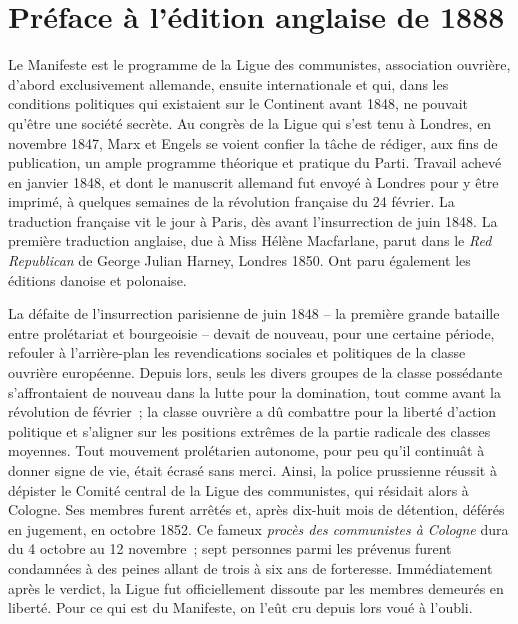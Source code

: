 \documentclass[french,twoside]{book} %
\begin{document}
\section[{Préface à l’édition anglaise de 1888}]{Préface à l’édition anglaise de 1888}
\noindent Le Manifeste est le programme de la Ligue des communistes, association ouvrière, d’abord exclusivement allemande, ensuite internationale et qui, dans les conditions politiques qui existaient sur le Continent avant 1848, ne pouvait qu’être une société secrète. Au congrès de la Ligue qui s’est tenu à Londres, en novembre 1847, Marx et Engels se voient confier la tâche de rédiger, aux fins de publication, un ample programme théorique et pratique du Parti. Travail achevé en janvier 1848, et dont le manuscrit allemand fut envoyé à Londres pour y être imprimé, à quelques semaines de la révolution française du 24 février. La traduction française vit le jour à Paris, dès avant l’insurrection de juin 1848. La première traduction anglaise, due à Miss Hélène Macfarlane, parut dans le \emph{Red Republican} de George Julian Harney, Londres 1850. Ont paru également les éditions danoise et polonaise.\par
La défaite de l’insurrection parisienne de juin 1848 – la première grande bataille entre prolétariat et bourgeoisie – devait de nouveau, pour une certaine période, refouler à l’arrière-plan les revendications sociales et politiques de la classe ouvrière européenne. Depuis lors, seuls les divers groupes de la classe possédante s’affrontaient de nouveau dans la lutte pour la domination, tout comme avant la révolution de février ; la classe ouvrière a dû combattre pour la liberté d’action politique et s’aligner sur les positions extrêmes de la partie radicale des classes moyennes. Tout mouvement prolétarien autonome, pour peu qu’il continuât à donner signe de vie, était écrasé sans merci. Ainsi, la police prussienne réussit à dépister le Comité central de la Ligue des communistes, qui résidait alors à Cologne. Ses membres furent arrêtés et, après dix-huit mois de détention, déférés en jugement, en octobre 1852. Ce fameux \emph{procès des communistes à Cologne} dura du 4 octobre au 12 novembre ; sept personnes parmi les prévenus furent condamnées à des peines allant de trois à six ans de forteresse. Immédiatement après le verdict, la Ligue fut officiellement dissoute par les membres demeurés en liberté. Pour ce qui est du Manifeste, on l’eût cru depuis lors voué à l’oubli.\par
\end{document}
